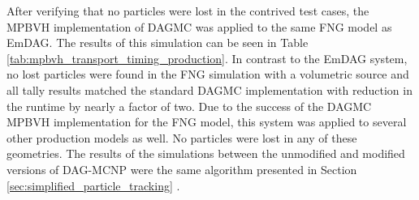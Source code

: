 After verifying that no particles were lost in the contrived test cases, the
MPBVH implementation of DAGMC was applied to the same FNG model as EmDAG. The
results of this simulation can be seen in Table
\ref{tab:mpbvh_transport_timing_production}. In contrast to the EmDAG system, no
lost particles were found in the FNG simulation with a volumetric source and all
tally results matched the standard DAGMC implementation with reduction in the
runtime by nearly a factor of two. Due to the success of the DAGMC MPBVH
implementation for the FNG model, this system was applied to several other
production models as well. No particles were lost in any of these
geometries. The results of the simulations between the unmodified and modified
versions of DAG-MCNP were the same \DIFdelbegin {}\DIFdelend \DIFaddbegin {}\DIFaddend algorithm presented in Section
\ref{sec:simplified_particle_tracking} \DIFdelbegin {}\DIFdelend \DIFaddbegin {}\DIFaddend .

